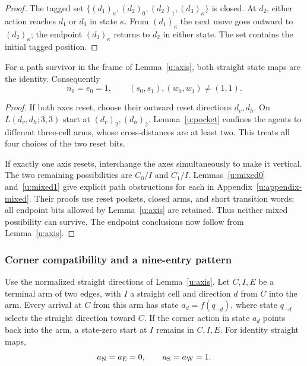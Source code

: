 \begin{proof}
The tagged set
$\{(d_1)_\kappa,(d_2)_0,(d_2)_1,(d_3)_\kappa\}$ is closed.
At $d_2$, either action reaches $d_1$ or $d_3$ in state $\kappa$.
From $(d_1)_\kappa$ the next move goes outward to $(d_2)_\kappa$;
the endpoint $(d_3)_\kappa$ returns to $d_2$ in either state.
The set contains the initial tagged position.
\end{proof}



\begin{lemma}\label{u:rigidity}
For a path survivor in the frame of Lemma~\ref{u:axis}, both
straight state maps are the identity. Consequently
\[
 n_0=e_0=1,
 \qquad (s_0,s_1),(w_0,w_1)\ne(1,1).
\]
\end{lemma}

\begin{proof}
If both axes reset, choose their outward reset directions $d_v,d_h$.
On $L(d_v,d_h;3,3)$ start at $(d_v)_2,(d_h)_2$.
Lemma~\ref{u:pocket} confines the agents to different three-cell
arms, whose cross-distances are at least two. This treats all four
choices of the two reset bits.

If exactly one axis resets, interchange the axes simultaneously to
make it vertical. The two remaining possibilities are
$C_0/I$ and $C_1/I$. Lemmas~\ref{u:mixed0} and~\ref{u:mixed1}
give explicit path obstructions for each in
Appendix~\ref{u:appendix-mixed}. Their proofs use reset pockets,
closed arms, and short transition words; all endpoint bits allowed by
Lemma~\ref{u:axis} are retained. Thus neither mixed possibility can
survive. The endpoint conclusions now follow from Lemma~\ref{u:axis}.
\end{proof}

\subsubsection{Corner compatibility and a nine-entry pattern}

\begin{lemma}\label{u:arrival}
Use the normalized straight directions of Lemma~\ref{u:axis}.
Let $C,I,E$ be a terminal arm of two edges, with $I$ a straight cell
and direction $d$ from $C$ into the arm. Every arrival at $C$ from
this arm has state $a_d=f(q_{-d})$, where state $q_{-d}$ selects the
straight direction toward $C$. If the corner action in state $a_d$
points back into the arm, a state-zero start at $I$ remains in
$C,I,E$. For identity straight maps,
\[
a_{\mathrm{N}}=a_{\mathrm{E}}=0,\qquad a_{\mathrm{S}}=a_{\mathrm{W}}=1.
\]
\end{lemma}

